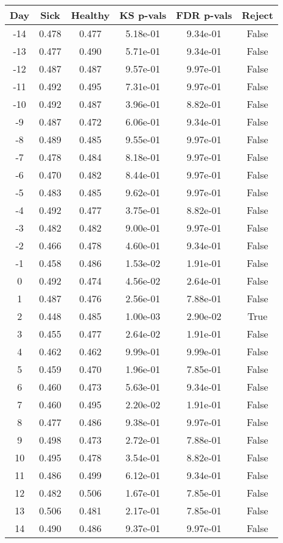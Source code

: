 \begin{tabular}{c|c|c|c|c|c}
Day &  Sick & Healthy &  KS p-vals & FDR p-vals & Reject\\
\hline
-14 & 0.478 &   0.477 &   5.18e-01 &   9.34e-01 &  False\\
-13 & 0.477 &   0.490 &   5.71e-01 &   9.34e-01 &  False\\
-12 & 0.487 &   0.487 &   9.57e-01 &   9.97e-01 &  False\\
-11 & 0.492 &   0.495 &   7.31e-01 &   9.97e-01 &  False\\
-10 & 0.492 &   0.487 &   3.96e-01 &   8.82e-01 &  False\\
 -9 & 0.487 &   0.472 &   6.06e-01 &   9.34e-01 &  False\\
 -8 & 0.489 &   0.485 &   9.55e-01 &   9.97e-01 &  False\\
 -7 & 0.478 &   0.484 &   8.18e-01 &   9.97e-01 &  False\\
 -6 & 0.470 &   0.482 &   8.44e-01 &   9.97e-01 &  False\\
 -5 & 0.483 &   0.485 &   9.62e-01 &   9.97e-01 &  False\\
 -4 & 0.492 &   0.477 &   3.75e-01 &   8.82e-01 &  False\\
 -3 & 0.482 &   0.482 &   9.00e-01 &   9.97e-01 &  False\\
 -2 & 0.466 &   0.478 &   4.60e-01 &   9.34e-01 &  False\\
 -1 & 0.458 &   0.486 &   1.53e-02 &   1.91e-01 &  False\\
  0 & 0.492 &   0.474 &   4.56e-02 &   2.64e-01 &  False\\
  1 & 0.487 &   0.476 &   2.56e-01 &   7.88e-01 &  False\\
  2 & 0.448 &   0.485 &   1.00e-03 &   2.90e-02 &   True\\
  3 & 0.455 &   0.477 &   2.64e-02 &   1.91e-01 &  False\\
  4 & 0.462 &   0.462 &   9.99e-01 &   9.99e-01 &  False\\
  5 & 0.459 &   0.470 &   1.96e-01 &   7.85e-01 &  False\\
  6 & 0.460 &   0.473 &   5.63e-01 &   9.34e-01 &  False\\
  7 & 0.460 &   0.495 &   2.20e-02 &   1.91e-01 &  False\\
  8 & 0.477 &   0.486 &   9.38e-01 &   9.97e-01 &  False\\
  9 & 0.498 &   0.473 &   2.72e-01 &   7.88e-01 &  False\\
 10 & 0.495 &   0.478 &   3.54e-01 &   8.82e-01 &  False\\
 11 & 0.486 &   0.499 &   6.12e-01 &   9.34e-01 &  False\\
 12 & 0.482 &   0.506 &   1.67e-01 &   7.85e-01 &  False\\
 13 & 0.506 &   0.481 &   2.17e-01 &   7.85e-01 &  False\\
 14 & 0.490 &   0.486 &   9.37e-01 &   9.97e-01 &  False\\
\end{tabular}